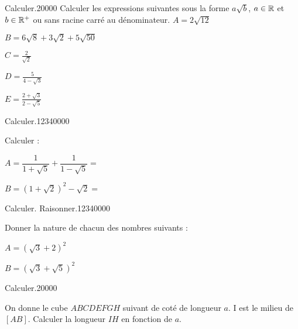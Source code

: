 
\begin{pageParcoursd} %





 



 \begin{ExoCdN}{Calculer.}{2}{0}{0}{0}{0}
Calculer les expressions suivantes sous la forme $a\sqrt{b}$, $a\in \mathbb R$ et $b \in \mathbb R^+$ ou sans racine carré au dénominateur.
$A=2\sqrt{12}$

$B= 6\sqrt{8} + 3\sqrt{2} + 5\sqrt{50}$

$C=\frac{2}{\sqrt{2}}$ 

$D= \frac{5}{4 - \sqrt{3}}$  

$E= \frac{2+\sqrt{3}}{2 - \sqrt{5}} $

\end{ExoCdN}




\begin{ExoCdN}{Calculer.}{1234}{0}{0}{0}{0}

Calculer : \vspace{0.4cm}

$A=\dfrac{1}{1+\sqrt5} +\dfrac{1}{1-\sqrt5} = $ 

$B=\left(1+\sqrt2\right)^2  -\sqrt2 = $ 
\end{ExoCdN}

 
\begin{ExoCdN}{Calculer. Raisonner.}{1234}{0}{0}{0}{0}

Donner la nature de chacun des nombres suivants : \vspace{0.4cm}

$A=\left( \sqrt3 + 2 \right)^2 $


$B=\left( \sqrt3 + \sqrt5 \right)^2 $
\end{ExoCdN}



 


\begin{ExoCdN}{Calculer.}{2}{0}{0}{0}{0}

 
On donne le cube $ABCDEFGH$ suivant de coté de longueur $a$. I est le milieu de $[AB]$. Calculer la longueur $IH$ en fonction de $a$.


\end{ExoCdN}
\end{pageParcoursd}
